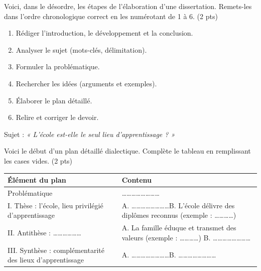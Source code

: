 \documentclass[11pt]{article}
\begin{document}
\begin{exercice}
Voici, dans le désordre, les étapes de l'élaboration d'une dissertation. Remets-les dans l'ordre chronologique correct en les numérotant de 1 à 6. (2 pts)
\begin{enumerate}
\item Rédiger l'introduction, le développement et la conclusion.
\item Analyser le sujet (mots-clés, délimitation).
\item Formuler la problématique.
\item Rechercher les idées (arguments et exemples).
\item Élaborer le plan détaillé.
\item Relire et corriger le devoir.
\end{enumerate}
\end{exercice}

\begin{exercice}
Sujet : \textit{« L'école est-elle le seul lieu d'apprentissage ? »}

Voici le début d'un plan détaillé dialectique. Complète le tableau en remplissant les cases vides. (2 pts)

\begin{tabularx}{\textwidth}{|l|X|}
\hline
\textbf{Élément du plan} & \textbf{Contenu} \\
\hline
Problématique & \ldots\ldots\ldots\ldots\ldots\ldots\ldots\ldots \\
\hline
I. Thèse : l'école, lieu privilégié d'apprentissage & A. \ldots\ldots\ldots\ldots\ldots\ldots\ldots\ldots \newline B. L'école délivre des diplômes reconnus (exemple : \ldots\ldots\ldots\ldots) \\
\hline
II. Antithèse : \ldots\ldots\ldots\ldots\ldots\ldots & A. La famille éduque et transmet des valeurs (exemple : \ldots\ldots\ldots\ldots) \newline B. \ldots\ldots\ldots\ldots\ldots\ldots\ldots\ldots \\
\hline
III. Synthèse : complémentarité des lieux d'apprentissage & A. \ldots\ldots\ldots\ldots\ldots\ldots\ldots\ldots \newline B. \ldots\ldots\ldots\ldots\ldots\ldots\ldots\ldots \\
\hline
\end{tabularx}
\end{exercice}
\end{document}
